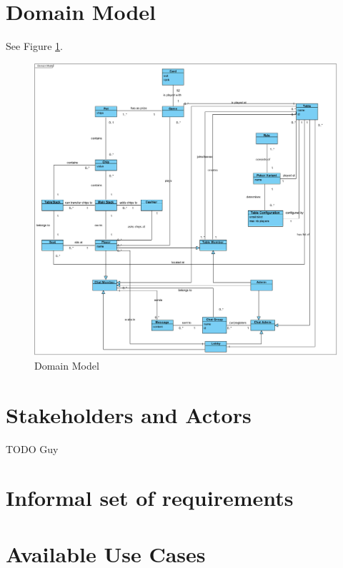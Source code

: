 \documentclass[a4paper,11pt]{report}
\begin{document}
\section{Domain Model}
See Figure \ref{fig:domain}.
\begin{figure}
  \begin{center}
    \includegraphics[scale=0.5]{img_domain_model.png}
  \end{center}
  \caption{Domain Model}\label{fig:domain}
\end{figure}
\section{Stakeholders and Actors}
TODO Guy
\section{Informal set of requirements}
\section{Available Use Cases}
\end{document}
